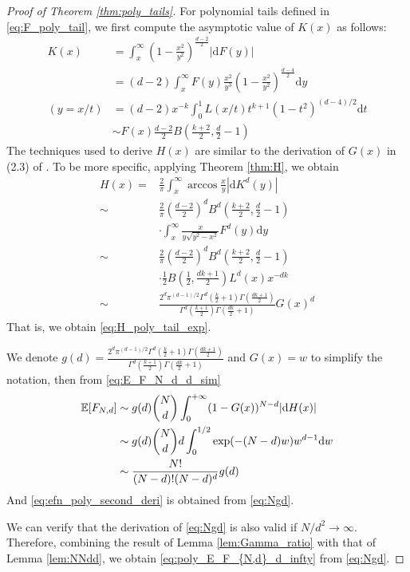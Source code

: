 \documentclass[conference,a4paper]{IEEEtran}
\def\E{\mathbb{E}}
\def\dd{\mathrm{d}}
\begin{document}
\begin{proof}[Proof of Theorem \ref{thm:poly_tails}]
For polynomial tails defined in \eqref{eq:F_poly_tail},
we first compute the asymptotic value of $K(x)$
as follows:
\begin{align*}
     K(x) & = \int_x^{\infty} (1-\frac{x^2}{y^2})^{\frac{d-2}{2}} |\dd F(y)| \\
     &= (d-2)\int_x^{\infty} F(y)\frac{x^2}{y^3} (1-\frac{x^2}{y^2})^{\frac{d-4}{2}} \dd y\\
     (y=x/t) &= (d-2)x^{-k} \int_0^{1} L(x/t) t^{k+1} (1-t^2)^{(d-4)/2}\dd t \\
     & \sim F(x) \frac{d-2}{2} B\left(\frac{k+2}{2}, \frac{d}{2}-1\right) 
\end{align*}
The techniques used to derive $H(x)$ are similar to the derivation of $G(x)$
in (2.3) of \cite{carnal1970konvexe}.
To be more specific, applying Theorem \ref{thm:H}, we obtain
\begin{align*}
     H(x) =& \frac{2}{\pi}
     \int_x^{\infty} \arccos\frac{x}{y}
     |\dd K^d(y)| \\
     \sim& \frac{2}{\pi}\left(\frac{d-2}{2}\right)^d
     B^d\left(\frac{k+2}{2}, \frac{d}{2}-1\right)\\
     &\cdot\int_x^{\infty} \frac{x}{y \sqrt{y^2-x^2}} F^d(y) \dd y \\
     \sim& \frac{2}{\pi}\left(\frac{d-2}{2}\right)^d
     B^d\left(\frac{k+2}{2}, \frac{d}{2}-1\right) \\
     &\cdot\frac{1}{2}
     B\left(\frac{1}{2}, \frac{dk+1}{2}\right)L^d(x) x^{-dk} \\
     \sim& \frac{2^d \pi^{(d-1)/2}\Gamma^d(\frac{k}{2}+1)
     \Gamma(\frac{dk+1}{2})}{
         \Gamma^d(\frac{k+1}{2}) \Gamma(\frac{dk}{2}+1)} G(x)^d 
\end{align*}
That is, we obtain \eqref{eq:H_poly_tail_exp}.

We denote $g(d)=\frac{2^d \pi^{(d-1)/2}\Gamma^d(\frac{k}{2}+1)
\Gamma(\frac{dk+1}{2})}{
    \Gamma^d(\frac{k+1}{2}) \Gamma(\frac{dk}{2}+1)}$
and $G(x)=w$ to simplify the notation, then from \eqref{eq:E_F_N_d_d_sim}
\begin{align}
     \E[F_{N,d}] &\sim g(d)\binom{N}{d} \int_0^{+\infty} 
      (1-G(x))^{N-d} |\dd H(x)| \notag \\
      &\sim g(d)\binom{N}{d}d\int_0^{1/2} \exp(-(N-d)w)w^{d-1}\dd w
      \notag \\
      &\sim \frac{N!}{(N-d)! (N-d)^d}g(d) \label{eq:Ngd}
\end{align}
And \eqref{eq:efn_poly_second_deri} is obtained from \eqref{eq:Ngd}.

We can verify that the derivation of \eqref{eq:Ngd} is also valid if $N/d^2\to \infty$.
Therefore, combining the result of Lemma \ref{lem:Gamma_ratio}
with that of Lemma \ref{lem:NNdd},
we obtain \eqref{eq:poly_E_F_{N,d}_d_infty}
from \eqref{eq:Ngd}.
\end{proof}
\end{document}
